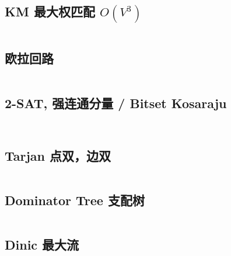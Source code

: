 \documentclass[titlepage, a4paper]{article}
\begin{document}
\begin{multicols}{2}
\begin{spacing}{0.6}
				\subsection{KM 最大权匹配 $O(V^3)$}
					\inputminted{cpp}{src/TreeandGraph/KM.cpp}
				\subsection{欧拉回路}
				\inputminted{cpp}{src/TreeandGraph/欧拉回路.cpp}
				\subsection{2-SAT, 强连通分量 / Bitset Kosaraju}
					\inputminted{cpp}{src/TreeandGraph/2-sat.cpp}
					\inputminted{cpp}{src/TreeandGraph/kosaraju.cpp}
				\subsection{Tarjan 点双，边双}
					\inputminted{cpp}{src/TreeandGraph/Tarjan.cpp}
				\subsection{Dominator Tree 支配树}
					\inputminted{cpp}{src/TreeandGraph/支配树.cpp}
				\subsection{Dinic 最大流}
					
					\inputminted[highlightlines={8,30}]{cpp}{src/TreeandGraph/Dinic.cpp}

\end{spacing}
\end{multicols}
\end{document}
